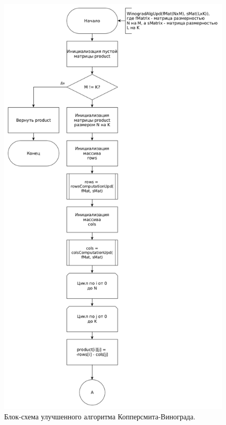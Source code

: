 \documentclass[12pt]{report}
\begin{document}
\begin{figure}
\begin{center}
\includegraphics[scale=0.33]{inc/img/WinogradUpd.png}
\captionsetup{justification=centering}
	\caption{Блок-схема улучшенного алгоритма Копперсмита-Винограда.}
	\label{img:WinogradUpd1}	
\end{center}
\end{figure}
\end{document}

